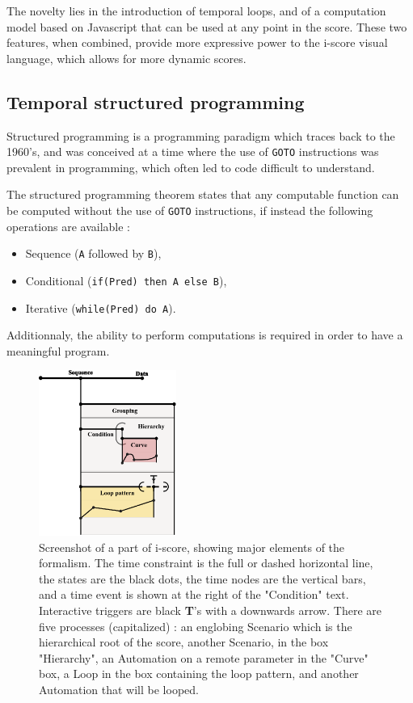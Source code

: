 \documentclass{article}
\begin{document}
The novelty lies in the introduction of temporal loops, and of a computation model 
based on Javascript that can be used at any point in the score. 
These two features, when combined, provide more expressive power to the i-score visual language, 
which allows for more dynamic scores.

\subsection{Temporal structured programming}
Structured programming is a programming paradigm which traces 
back to the 1960's, and was conceived at a time where the use of \lstinline{GOTO}
instructions was prevalent in programming, which often led to code difficult to understand.

The structured programming theorem\cite{bohm1966flow,mills1972mathematical} states that any computable function can be computed 
without the use of \lstinline{GOTO} instructions, if instead the following operations are available : 
\begin{itemize}
    \item Sequence (\lstinline{A} followed by \lstinline{B}), 
    \item Conditional (\lstinline{if(Pred) then A else B}), 
    \item Iterative (\lstinline{while(Pred) do A}).
\end{itemize}

Additionnaly, the ability to perform computations is required in order to have a meaningful program.

\begin{figure}
    \centering
    \includegraphics[width=0.40\textwidth]{images/hierarchy.eps}
    \caption{Screenshot of a part of i-score, showing major elements of the formalism. The time constraint is the full or dashed horizontal line, the states are the black dots, the time nodes are the vertical bars, and a time event is shown at the right of the "Condition" text. Interactive triggers are black \textbf{T}'s with a downwards arrow. There are five processes (capitalized) : an englobing Scenario which is the hierarchical root of the score, another Scenario, in the box "Hierarchy", an Automation on a remote parameter in the "Curve" box, a Loop in the box containing the loop pattern, and another Automation that will be looped.}
    \label{fig.hierarchy}
\end{figure}
\end{document}
